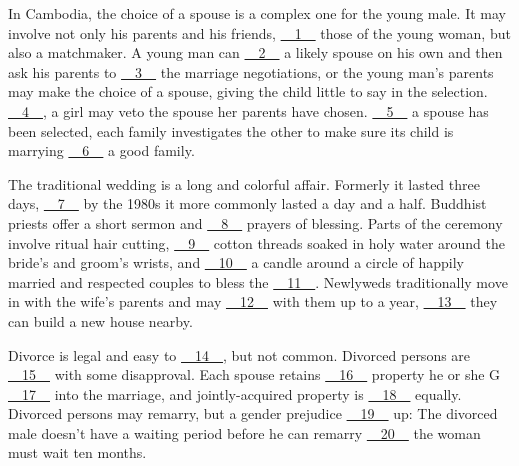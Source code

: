 In Cambodia, the choice of a spouse is a complex one for the young male. It may involve not only his parents and his friends, \uline{~~1~~} those of the young woman,   but also a matchmaker. A young man can \uline{~~2~~} a likely spouse on his own and then ask his parents to \uline{~~3~~} the marriage negotiations, or the young man's   parents may make the choice of a spouse, giving the child little to say in the selection. \uline{~~4~~}, a girl may veto the spouse her parents have chosen. \uline{~~5~~} a spouse has been selected, each family investigates the other to make sure its child is marrying \uline{~~6~~} a good family.


The traditional wedding is a long and colorful affair. Formerly it lasted three days, \uline{~~7~~} by the 1980s it more commonly lasted a day and a half. Buddhist priests offer a short sermon and \uline{~~8~~} prayers of blessing. Parts of the ceremony involve ritual hair cutting, \uline{~~9~~} cotton threads soaked in holy water around the bride's and groom's wrists, and \uline{~~10~~} a candle around a circle of happily married and respected couples to bless the \uline{~~11~~}. Newlyweds traditionally move in with the wife's parents and may \uline{~~12~~} with them up to a year, \uline{~~13~~} they can build a new house nearby.


Divorce is legal and easy to \uline{~~14~~}, but not common. Divorced persons are \uline{~~15~~} with some disapproval. Each spouse retains \uline{~~16~~} property he or she G \uline{~~17~~} into the marriage, and jointly-acquired property is \uline{~~18~~} equally. Divorced persons may remarry, but a gender prejudice \uline{~~19~~} up: The divorced male doesn't have a waiting period before he can remarry \uline{~~20~~} the woman must wait ten months.